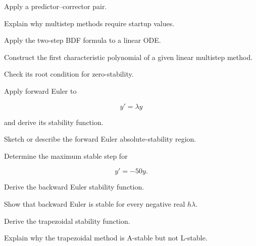 \begin{exercise}[3]
Apply a predictor--corrector pair.
\end{exercise}

\begin{exercise}[3]
Explain why multistep methods require startup values.
\end{exercise}

\begin{exercise}[3]
Apply the two-step BDF formula to a linear ODE.
\end{exercise}

\begin{exercise}[3]
Construct the first characteristic polynomial of a given linear multistep
method.
\end{exercise}

\begin{exercise}[3]
Check its root condition for zero-stability.
\end{exercise}

\begin{exercise}[2]
Apply forward Euler to

\[
y'=\lambda y
\]

and derive its stability function.
\end{exercise}

\begin{exercise}[3]
Sketch or describe the forward Euler absolute-stability region.
\end{exercise}

\begin{exercise}[3]
Determine the maximum stable step for

\[
y'=-50y.
\]
\end{exercise}

\begin{exercise}[3]
Derive the backward Euler stability function.
\end{exercise}

\begin{exercise}[3]
Show that backward Euler is stable for every negative real \(h\lambda\).
\end{exercise}

\begin{exercise}[3]
Derive the trapezoidal stability function.
\end{exercise}

\begin{exercise}[3]
Explain why the trapezoidal method is A-stable but not L-stable.
\end{exercise}

